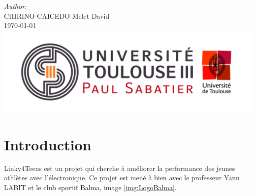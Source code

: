 \documentclass[12pt]{article}
\begin{document}
\begin{titlepage}
\Large \emph{Author:}\\
\textsc{CHIRINO CAICEDO} Melet David \\[2cm] %


{\large \today}\\[2cm] %


\includegraphics[width=6in]{img/Logo_UT3.jpg}\\[2cm] %
 

\vfill %

\end{titlepage}

\tableofcontents

\newpage


\section{Introduction}
Linky4Teens est un projet qui cherche à améliorer la performance des jeunes athlètes avec l'électronique. Ce projet est mené à bien avec le professeur Yann LABIT et le club sportif Balma, image \ref{img:LogoBalma}.
\end{document}
